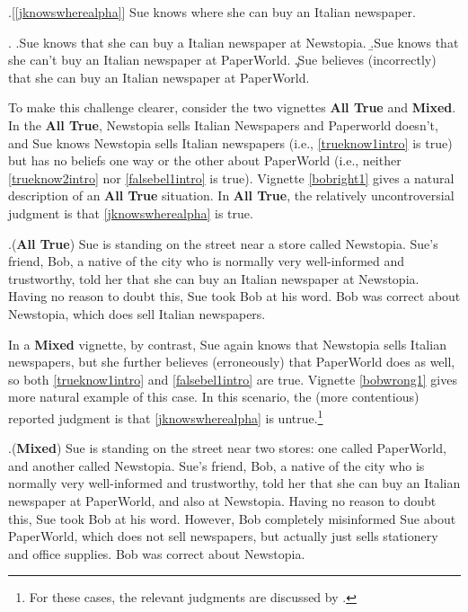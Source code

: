 \documentclass[a4paper]{article}
\begin{document}
\ex.[\ref{jknowswherealpha}]\label{sknwha} Sue knows where she can buy an Italian newspaper.


\ex. \a.\label{trueknow1intro}Sue knows that she can buy a Italian newspaper at Newstopia.
\b.\label{trueknow2intro}Sue knows that she can't buy an Italian newspaper at PaperWorld.
\c.\label{falsebel1intro}Sue believes (incorrectly) that she can buy an Italian newspaper at PaperWorld.

To make this challenge clearer, consider the two vignettes \textbf{All True} and \textbf{Mixed}. In the \textbf{All True}, Newstopia sells Italian Newspapers and Paperworld doesn't, and Sue knows Newstopia sells Italian newspapers (i.e., \ref{trueknow1intro} is true) but has no beliefs one way or the other about PaperWorld (i.e., neither \ref{trueknow2intro} nor \ref{falsebel1intro} is true). Vignette \ref{bobright1} gives a natural description of an \textbf{All True} situation. In \textbf{All True}, the relatively uncontroversial judgment is that \ref{jknowswherealpha} is true.

\ex.\label{bobright1}(\textbf{All True}) Sue is standing on the street near a store called Newstopia. Sue's friend, Bob, a native of the city who is normally very well-informed and trustworthy, told her that she can buy an Italian newspaper at Newstopia. Having no reason to doubt this, Sue took Bob at his word. Bob was correct about Newstopia, which does sell Italian newspapers.

In a \textbf{Mixed} vignette, by contrast, Sue again knows that Newstopia sells Italian newspapers, but she further believes (erroneously) that PaperWorld does as well, so both \ref{trueknow1intro} and \ref{falsebel1intro} are true. Vignette \ref{bobwrong1} gives  more natural example of this case. In this scenario, the (more contentious) reported judgment is that \ref{jknowswherealpha} is untrue.\footnote{For these cases, the relevant judgments are discussed by \citet{george:dis,george:thought,cremers:plurality,theiler:etal,xiang:sub:16}.}

\ex.\label{bobwrong1}(\textbf{Mixed}) Sue is standing on the street near two stores: one called PaperWorld, and another called Newstopia. Sue's friend, Bob, a native of the city who is normally very well-informed and trustworthy, told her that she can buy an Italian newspaper at PaperWorld, and also at Newstopia. Having no reason to doubt this, Sue took Bob at his word. However, Bob completely misinformed Sue about PaperWorld, which does not sell newspapers, but actually just sells stationery and office supplies. Bob was correct about Newstopia.
\end{document}
